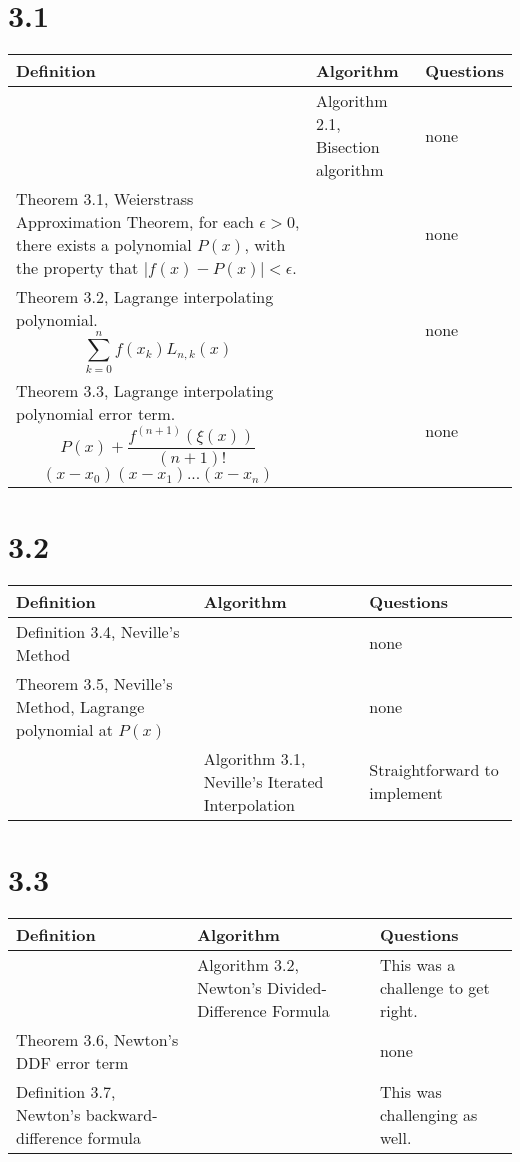 \documentclass{article}
\begin{document}
\section*{3.1}

\begin{tabularx}{\textwidth}{ |X|X|X| }
    \hline
	{\bf Definition} & {\bf Algorithm} & {\bf Questions} \\
    \hline
	 & Algorithm 2.1, Bisection algorithm & none \\
    \hline
	Theorem 3.1, Weierstrass Approximation Theorem, for each $\epsilon > 0$, there exists a polynomial $P(x)$, with the property that $|f(x)-P(x)|<\epsilon$. & & none \\
    \hline
	Theorem 3.2, Lagrange interpolating polynomial. $$\sum_{k=0}^{n}f(x_k)L_{n,k}(x)$$ & & none \\
    \hline
	Theorem 3.3, Lagrange interpolating polynomial error term. $$P(x)+\frac{f^{(n+1)}(\xi(x))}{(n+1)!}$$ $$(x-x_0)(x-x_1)...(x-x_n)$$ & & none \\
    \hline
\end{tabularx}

\section*{3.2}

\begin{tabularx}{\textwidth}{ |X|X|X| }
    \hline
	{\bf Definition} & {\bf Algorithm} & {\bf Questions} \\
    \hline
	Definition 3.4, Neville's Method & & none \\
    \hline
	Theorem 3.5, Neville's Method, Lagrange polynomial at $P(x)$  & & none \\
    \hline
	 & Algorithm 3.1, Neville's Iterated Interpolation & Straightforward to implement \\
    \hline
\end{tabularx}

\section*{3.3}

\begin{tabularx}{\textwidth}{ |X|X|X| }
    \hline
	{\bf Definition} & {\bf Algorithm} & {\bf Questions} \\
    \hline
	 & Algorithm 3.2, Newton's Divided-Difference Formula & This was a challenge to get right. \\
    \hline
	Theorem 3.6, Newton's DDF error term & & none \\
    \hline
	Definition 3.7, Newton's backward-difference formula & & This was challenging as well. \\
    \hline
\end{tabularx}
\end{document}
